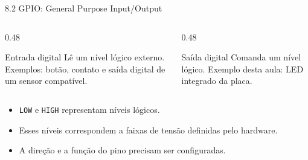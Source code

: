 \begin{frame}[t]{8.2 GPIO: General Purpose Input/Output}
\begin{columns}[T]
\begin{column}{0.48\textwidth}\begin{block}{Entrada digital}
Lê um nível lógico externo. Exemplos: botão, contato e saída digital de um sensor compatível.
\end{block}\end{column}
\begin{column}{0.48\textwidth}\begin{block}{Saída digital}
Comanda um nível lógico. Exemplo desta aula: LED integrado da placa.
\end{block}\end{column}
\end{columns}
\medskip
\begin{itemize}
\item \texttt{LOW} e \texttt{HIGH} representam níveis lógicos.
\item Esses níveis correspondem a faixas de tensão definidas pelo hardware.
\item A direção e a função do pino precisam ser configuradas.
\end{itemize}
\end{frame}

